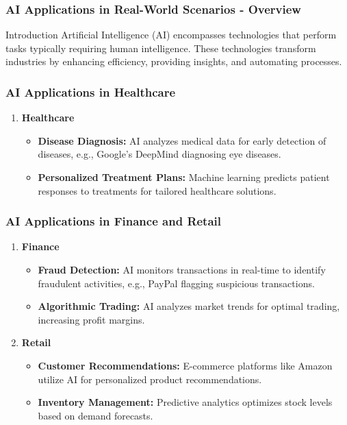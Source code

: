 \documentclass[aspectratio=169]{beamer}
\begin{document}
\begin{frame}[fragile]
  \frametitle{AI Applications in Real-World Scenarios - Overview}
  \begin{block}{Introduction}
    Artificial Intelligence (AI) encompasses technologies that perform tasks typically requiring human intelligence. 
    These technologies transform industries by enhancing efficiency, providing insights, and automating processes.
  \end{block}
\end{frame}

\begin{frame}[fragile]
  \frametitle{AI Applications in Healthcare}
  \begin{enumerate}
    \item \textbf{Healthcare}
      \begin{itemize}
        \item \textbf{Disease Diagnosis:} AI analyzes medical data for early detection of diseases, e.g., Google's DeepMind diagnosing eye diseases.
        \item \textbf{Personalized Treatment Plans:} Machine learning predicts patient responses to treatments for tailored healthcare solutions.
      \end{itemize}
  \end{enumerate}
\end{frame}

\begin{frame}[fragile]
  \frametitle{AI Applications in Finance and Retail}
  \begin{enumerate}
    \item \textbf{Finance}
      \begin{itemize}
        \item \textbf{Fraud Detection:} AI monitors transactions in real-time to identify fraudulent activities, e.g., PayPal flagging suspicious transactions.
        \item \textbf{Algorithmic Trading:} AI analyzes market trends for optimal trading, increasing profit margins.
      \end{itemize}
    
    \item \textbf{Retail}
      \begin{itemize}
        \item \textbf{Customer Recommendations:} E-commerce platforms like Amazon utilize AI for personalized product recommendations.
        \item \textbf{Inventory Management:} Predictive analytics optimizes stock levels based on demand forecasts.
      \end{itemize}
  \end{enumerate}
\end{frame}
\end{document}
